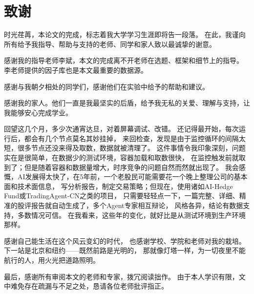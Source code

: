 
\clearpage
{}
{}

\chapter*{致谢}
时光荏苒，本论文的完成，标志着我大学学习生涯即将告一段落。
在此，我谨向所有给予我指导、帮助与支持的老师、同学和家人致以最诚挚的谢意。

感谢我的指导老师李斌，本文的完成离不开老师在选题、框架和细节上的指导。
李老师提供的因子库也是本文最重要的数据源。

感谢与我朝夕相处的同学们，感谢他们在实验中给予的帮助和建议。

感谢我的家人。他们一直是我最坚实的后盾，给予我无私的关爱、理解与支持，让我能够安心完成学业。

回望这几个月，多少次通宵达旦，对着屏幕调试、改错。
还记得最开始，每次运行后，都会有几个节点莫名其妙挂掉，
来回检查，发现是由于监控循环的间隔太短，很多节点还没来得及取数，数据就被清理了。
这件事情令我印象深刻，问题实在是很简单，在数据少的测试环境，容器加载和取数很快，
在监控触发前就取到了；但是随着容器和数据量增大，时序竞争的问题自然而然就出现了。
我会感慨，AI发展得太快了，在5年前，一个老股民可能需要花一个晚上整理公司的基本面和技术面信息，
写分析报告，制定交易策略；但现在，使用诸如AI-Hedge Fund或TradingAgent-CN之类的项目，
只需要轻轻点一下，一篇完整、详细、精准的股评报告就自动生成了，多个Agent专家相互辩论，
风格各异，结论有数据支持，多数情况可信。
在我看来，这些年的变化，就好比是从测试环境到生产环境那样。

感谢自己能生活在这个风云变幻的时代，
也感谢学校、学院和老师对我的栽培。
下一站是北京和纽约——既然前路是光明的，
那就像灯塔一样，为一切夜里不能航行的人，用火光把道路照明。

最后，感谢所有审阅本文的老师和专家，拨冗阅读拙作。
由于本人学识有限，文中难免存在疏漏与不足之处，恳请各位老师批评指正。
